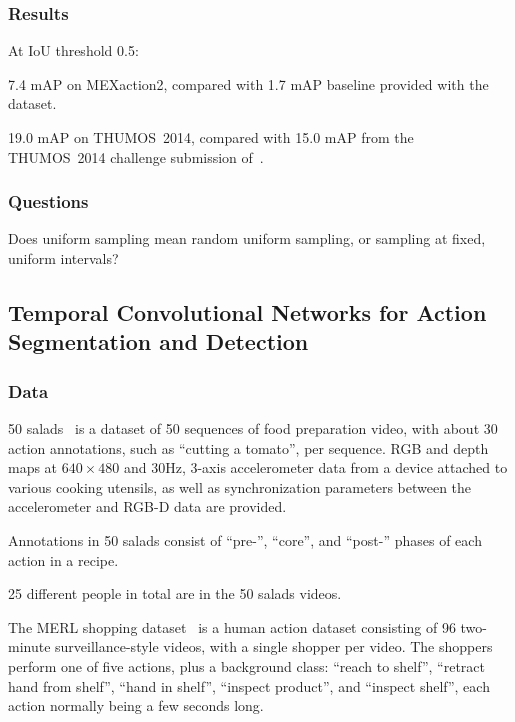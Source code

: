 \documentclass[a4paper, 12pt]{article}
\begin{document}
\subsubsection{Results}

At IoU threshold 0.5:

7.4 mAP on MEXaction2, compared with 1.7 mAP baseline provided with the
dataset.

19.0 mAP on THUMOS~2014, compared with 15.0 mAP from the THUMOS~2014 challenge
submission of~\citet{LearSubmissionThumos2014}.

\subsubsection{Questions}

Does uniform sampling mean random uniform sampling, or sampling at fixed,
uniform intervals?


\subsection{Temporal Convolutional Networks for Action Segmentation and
            Detection\citet{DBLP:journals/corr/LeaFVRH16}}

\subsubsection{Data}

50 salads~\citet{Stein:2013:CEA:2493432.2493482} is a dataset of 50 sequences of
food preparation video, with about 30 action annotations, such as ``cutting a
tomato'', per sequence. RGB and depth maps at $640 \times 480$ and 30Hz, 3-axis
accelerometer data from a device attached to various cooking utensils, as well
as synchronization parameters between the accelerometer and RGB-D data are
provided.

Annotations in 50 salads consist of ``pre-'', ``core'', and ``post-'' phases of
each action in a recipe.

25 different people in total are in the 50 salads videos.

The MERL shopping dataset~\citet{merl-shopping-singh} is a human action dataset
consisting of 96 two-minute surveillance-style videos, with a single shopper
per video.  The shoppers perform one of five actions, plus a background class:
``reach to shelf'', ``retract hand from shelf'', ``hand in shelf'', ``inspect
product'', and ``inspect shelf'', each action normally being a few seconds
long.
\end{document}
